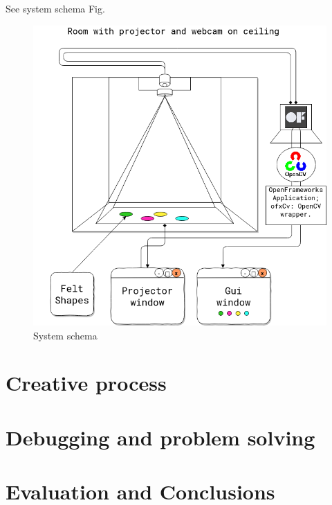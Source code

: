 \documentclass[12pt]{report}
\begin{document}
See system schema Fig.  

\begin{figure}[htbp]
\centering
\includegraphics[width=15cm]{assets/project-schema-final.png}
\caption{System schema \label{systemSchema}}
\end{figure}


\chapter{Creative process}
\label{sec:orge9d510a}
\chapter{Debugging and problem solving}
\label{sec:orgb4213fb}
\chapter{Evaluation and Conclusions}
\label{sec:org05b6f4a}
 

\end{document}
